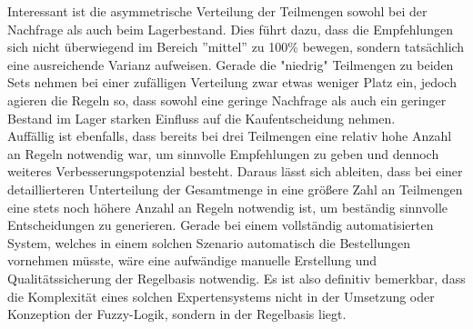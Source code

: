 \documentclass[]{scrartcl}
\begin{document}
Interessant ist die asymmetrische Verteilung der Teilmengen sowohl bei der Nachfrage als auch beim Lagerbestand. Dies führt dazu, dass die Empfehlungen sich nicht überwiegend im Bereich ''mittel'' zu 100\% bewegen, sondern tatsächlich eine ausreichende Varianz aufweisen. Gerade die "niedrig" Teilmengen zu beiden Sets nehmen bei einer zufälligen Verteilung zwar etwas weniger Platz ein, jedoch agieren die Regeln so, dass sowohl eine geringe Nachfrage als auch ein geringer Bestand im Lager starken Einfluss auf die Kaufentscheidung nehmen.
\\

Auffällig ist ebenfalls, dass bereits bei drei Teilmengen eine relativ hohe Anzahl an Regeln notwendig war, um sinnvolle Empfehlungen zu geben und dennoch weiteres Verbesserungspotenzial besteht. Daraus lässt sich ableiten, dass bei einer detaillierteren Unterteilung der Gesamtmenge in eine größere Zahl an Teilmengen eine stets noch höhere Anzahl an Regeln notwendig ist, um beständig sinnvolle Entscheidungen zu generieren. Gerade bei einem vollständig automatisierten System, welches in einem solchen Szenario automatisch die Bestellungen vornehmen müsste, wäre eine aufwändige manuelle Erstellung und Qualitätssicherung der Regelbasis notwendig. Es ist also definitiv bemerkbar, dass die Komplexität eines solchen Expertensystems nicht in der Umsetzung oder Konzeption der Fuzzy-Logik, sondern in der Regelbasis liegt. 
\end{document}
